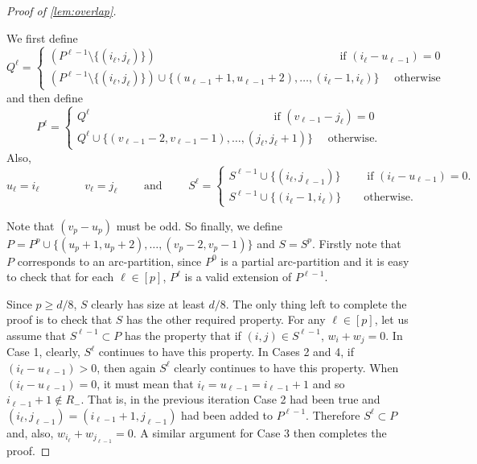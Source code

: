 \documentclass{article}
\begin{document}
\begin{proof}[Proof of \autoref{lem:overlap}]
\begin{enumerate}
        We first define
        \[
            Q^\ell = \begin{cases}
                (P^{\ell-1} \setminus \{(i_\ell, j_\ell)\}) \qquad \qquad \qquad \qquad  \qquad \qquad \qquad \qquad \text{ if } (i_\ell - u_{\ell-1}) = 0 \\
                (P^{\ell-1} \setminus \{(i_\ell, j_\ell)\}) \cup \{(u_{\ell-1}+1, u_{\ell-1}+2), \ldots, (i_\ell -1, i_\ell)\} \quad \text{ otherwise}
            \end{cases} 
        \]
        and then define
        \[
            P^\ell = \begin{cases}
                Q^\ell \qquad \qquad \qquad \qquad \qquad \qquad \qquad \qquad \text{ if } (v_{\ell-1} - j_\ell) = 0 \\
                Q^\ell \cup \{(v_{\ell-1}-2, v_{\ell-1}-1), \ldots, (j_\ell, j_\ell +1)\} \quad \text{ otherwise.}
            \end{cases}
        \]
        Also,
        \[
            u_\ell = i_\ell \qquad \qquad v_\ell = j_\ell \qquad \text{ and } \qquad S^\ell = \begin{cases}
                S^{\ell -1} \cup \{(i_\ell, j_{\ell -1})\} \qquad \text{ if } (i_\ell - u_{\ell-1}) = 0.  \\
                S^{\ell -1} \cup \{(i_\ell -1, i_\ell)\} \qquad \text{otherwise.}
            \end{cases}
        \]
    \end{enumerate}  
    Note that $(v_p - u_p)$ must be odd.
    So finally, we define $P = P^p \cup \{(u_p+1, u_p+2), \ldots, (v_p-2, v_p-1)\}$ and $S = S^p$.
    Firstly note that $P$ corresponds to an arc-partition, since $P^0$ is a partial arc-partition and it is easy to check that for each $\ell \in [p]$, $P^\ell$ is a valid extension of $P^{\ell-1}$.
    
    Since $p \geq d/8$, $S$ clearly has size at least $d/8$.
    The only thing left to complete the proof is to check that $S$ has the other required property.
    For any $\ell \in [p]$, let us assume that $S^{\ell -1} \subset P$ has the property that if $(i,j) \in S^{\ell -1}$, $w_i + w_j = 0$.    
    In Case 1, clearly, $S^\ell$ continues to have this property.
    In Cases 2 and 4, if $(i_\ell - u_{\ell-1}) > 0$, then again $S^\ell$ clearly continues to have this property.
    When $(i_\ell - u_{\ell-1}) = 0$, it must mean that $i_\ell = u_{\ell-1} = i_{\ell -1} + 1$ and so $i_{\ell -1} + 1 \not\in R_-$.
    That is, in the previous iteration Case 2 had been true and $(i_\ell, j_{\ell -1}) = (i_{\ell -1} + 1, j_{\ell -1})$ had been added to $P^{\ell -1}$.
    Therefore $S^\ell \subset P$ and, also, $w_{i_\ell} + w_{j_{\ell -1}} = 0$.
    A similar argument for Case 3 then completes the proof.
\end{proof}
\end{document}
